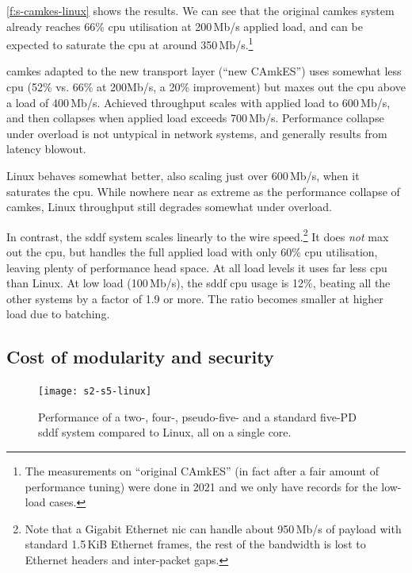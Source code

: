 \documentclass[a4paper,12pt]{report}
\begin{document}
\autoref{f:s-camkes-linux} shows the results. We can see that the
original \gls{camkes} system already reaches 66\% \gls{cpu} utilisation at
200\,Mb/s applied load, and can be expected to saturate the \gls{cpu} at
around 350\,Mb/s.\footnote{The measurements on ``original CAmkES''
  (in fact after a fair amount of performance tuning) were done in 2021
  and we only have records for the low-load cases.}

\gls{camkes} adapted to the new transport layer  (``new CAmkES'') uses somewhat less \gls{cpu} (52\%
vs. 66\% at 200Mb/s, a 20\% improvement) but maxes out the \gls{cpu} above a load of
400\,Mb/s. Achieved throughput  scales with applied load to 600\,Mb/s, and then collapses
when applied load exceeds 700\,Mb/s. Performance
collapse under overload is not untypical in network systems, and
generally results from latency blowout.

Linux behaves somewhat better, also scaling just over 600\,Mb/s, when it saturates
the \gls{cpu}. While nowhere near as extreme as the performance collapse of
\gls{camkes}, Linux throughput still degrades somewhat under overload.

In contrast, the \gls{sddf} system scales linearly to the wire
speed.\footnote{Note that a Gigabit Ethernet \gls{nic} can handle about
  950\,Mb/s of payload with standard 1.5\,KiB Ethernet frames, the rest of the bandwidth is lost to
  Ethernet headers and inter-packet gaps.} It
does \emph{not} max out the \gls{cpu}, but handles the full applied load
with only 60\% \gls{cpu} utilisation, leaving plenty of performance
head space. At all load levels it uses far less \gls{cpu}
than Linux. At low load (100\,Mb/s), the \gls{sddf} \gls{cpu}
usage is 12\%, beating all the other systems by a factor of 1.9 or
more. The ratio becomes smaller at higher
load due to batching.

\subsection{Cost of modularity and security}\label{s:modul}

\begin{figure}[t]
  \centering
  \texttt{[image: s2-s5-linux]}
  \caption[Performance of differently modularised \gls{sddf} systems compared to Linux.]{Performance of a two-, four-, pseudo-five- and  a standard
    five-PD \gls{sddf} system compared to Linux, all on a single core.}
  \label{f:2-5-PD}
\end{figure}
\end{document}
